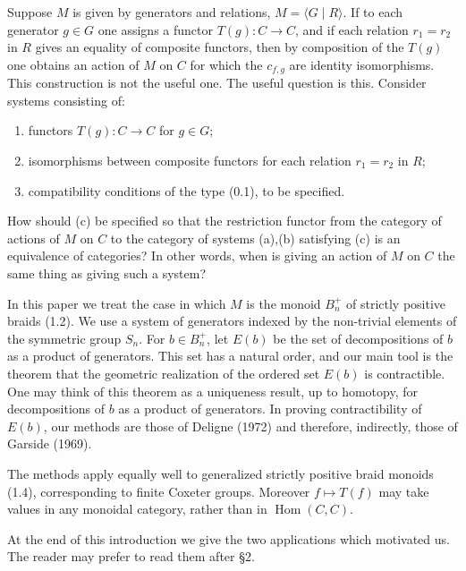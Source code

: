 \documentclass[11pt]{article}
\newcommand{\Hom}{\operatorname{Hom}}
\begin{document}
Suppose $M$ is given by generators and relations, $M=\langle G\mid R\rangle$. If to each generator $g\in G$ one assigns a functor $T(g):C\to C$, and if each relation $r_1=r_2$ in $R$ gives an equality of composite functors, then by composition of the $T(g)$ one obtains an action of $M$ on $C$ for which the $c_{f,g}$ are identity isomorphisms. This construction is not the useful one. The useful question is this. Consider systems consisting of:
\begin{enumerate}[label=(\alph*)]
\item functors $T(g):C\to C$ for $g\in G$;
\item isomorphisms between composite functors for each relation $r_1=r_2$ in $R$;
\item compatibility conditions of the type (0.1), to be specified.
\end{enumerate}
How should (c) be specified so that the restriction functor from the category of actions of $M$ on $C$ to the category of systems (a),(b) satisfying (c) is an equivalence of categories? In other words, when is giving an action of $M$ on $C$ the same thing as giving such a system?

In this paper we treat the case in which $M$ is the monoid $B_n^+$ of strictly positive braids (1.2). We use a system of generators indexed by the non-trivial elements of the symmetric group $S_n$. For $b\in B_n^+$, let $E(b)$ be the set of decompositions of $b$ as a product of generators. This set has a natural order, and our main tool is the theorem that the geometric realization of the ordered set $E(b)$ is contractible. One may think of this theorem as a uniqueness result, up to homotopy, for decompositions of $b$ as a product of generators. In proving contractibility of $E(b)$, our methods are those of Deligne (1972) and therefore, indirectly, those of Garside (1969).

The methods apply equally well to generalized strictly positive braid monoids (1.4), corresponding to finite Coxeter groups. Moreover $f\mapsto T(f)$ may take values in any monoidal category, rather than in $\Hom(C,C)$.

At the end of this introduction we give the two applications which motivated us. The reader may prefer to read them after §2.
\end{document}
